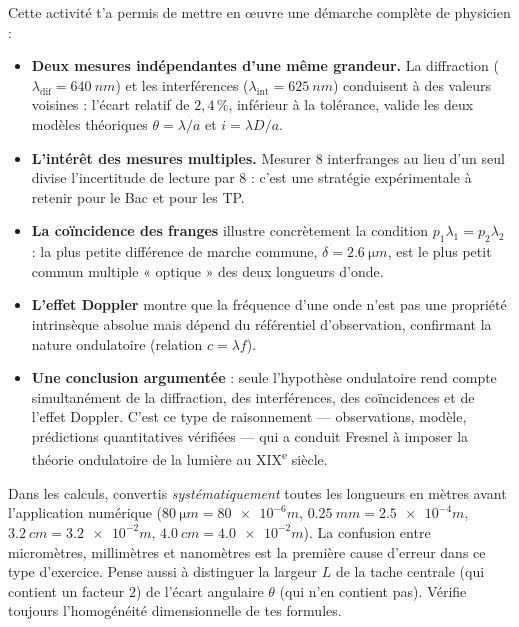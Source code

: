 \documentclass[11pt]{article}
\begin{document}
Cette activité t'a permis de mettre en œuvre une démarche complète de physicien :
\begin{itemize}
\item \textbf{Deux mesures indépendantes d'une même grandeur.} La diffraction ($\lambda_{\text{dif}} = \SI{640}{nm}$) et les interférences ($\lambda_{\text{int}} = \SI{625}{nm}$) conduisent à des valeurs voisines : l'écart relatif de $2,4\,\%$, inférieur à la tolérance, valide les deux modèles théoriques $\theta = \lambda/a$ et $i = \lambda D/a$.
\item \textbf{L'intérêt des mesures multiples.} Mesurer $8$ interfranges au lieu d'un seul divise l'incertitude de lecture par $8$ : c'est une stratégie expérimentale à retenir pour le Bac et pour les TP.
\item \textbf{La coïncidence des franges} illustre concrètement la condition $p_1\lambda_1 = p_2\lambda_2$ : la plus petite différence de marche commune, $\delta = \SI{2,6}{\micro m}$, est le plus petit commun multiple « optique » des deux longueurs d'onde.
\item \textbf{L'effet Doppler} montre que la fréquence d'une onde n'est pas une propriété intrinsèque absolue mais dépend du référentiel d'observation, confirmant la nature ondulatoire (relation $c = \lambda f$).
\item \textbf{Une conclusion argumentée} : seule l'hypothèse ondulatoire rend compte simultanément de la diffraction, des interférences, des coïncidences et de l'effet Doppler. C'est ce type de raisonnement — observations, modèle, prédictions quantitatives vérifiées — qui a conduit Fresnel à imposer la théorie ondulatoire de la lumière au XIX\textsuperscript{e} siècle.
\end{itemize}

\begin{attention}
Dans les calculs, convertis \emph{systématiquement} toutes les longueurs en mètres avant l'application numérique ($\SI{80}{\micro m} = \num{80e-6}{m}$, $\SI{0,25}{mm} = \num{2,5e-4}{m}$, $\SI{3,2}{cm} = \num{3,2e-2}{m}$, $\SI{4,0}{cm} = \num{4,0e-2}{m}$). La confusion entre micromètres, millimètres et nanomètres est la première cause d'erreur dans ce type d'exercice. Pense aussi à distinguer la largeur $L$ de la tache centrale (qui contient un facteur $2$) de l'écart angulaire $\theta$ (qui n'en contient pas). Vérifie toujours l'homogénéité dimensionnelle de tes formules.
\end{attention}
\end{document}
